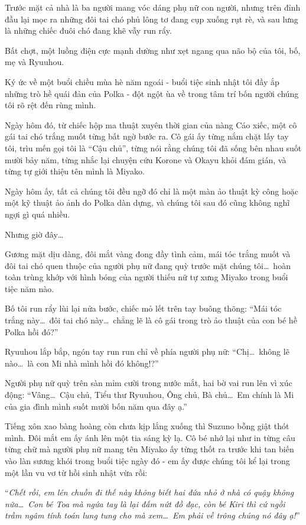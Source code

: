 \documentclass[../main.tex]{subfiles}
\begin{document}
Trước mặt cả nhà là ba người mang vóc dáng phụ nữ con người, nhưng trên đỉnh đầu lại mọc ra những đôi tai chó phủ lông tơ đang cụp xuống rụt rè, và sau lưng là những chiếc đuôi chó đang khẽ vẫy run rẩy.

Bất chợt, một luồng điện cực mạnh dường như xẹt ngang qua não bộ của tôi, bố, mẹ và Ryuuhou.

Ký ức về một buổi chiều mùa hè năm ngoái - buổi tiệc sinh nhật tôi đầy ắp những trò hề quái đản của Polka - đột ngột ùa về trong tâm trí bốn người chúng tôi rõ rệt đến rùng mình.

Ngày hôm đó, từ chiếc hộp ma thuật xuyên thời gian của nàng Cáo xiếc, một cô gái tai chó trắng muốt từng bất ngờ bước ra. Cô gái ấy từng nắm chặt lấy tay tôi, trìu mến gọi tôi là ``Cậu chủ'', từng nói rằng chúng tôi đã sống bên nhau suốt mười bảy năm, từng nhắc lại chuyện cứu Korone và Okayu khỏi đám gián, và từng tự giới thiệu tên mình là Miyako.

Ngày hôm ấy, tất cả chúng tôi đều ngỡ đó chỉ là một màn ảo thuật kỳ công hoặc một kỹ thuật ảo ảnh do Polka dàn dựng, và chúng tôi sau đó cũng không nghĩ ngợi gì quá nhiều.

Nhưng giờ đây\dots

Gương mặt dịu dàng, đôi mắt vàng đong đầy tình cảm, mái tóc trắng muốt và đôi tai chó quen thuộc của người phụ nữ đang quỳ trước mặt chúng tôi\dots\ hoàn toàn trùng khớp với hình bóng của người thiếu nữ tự xưng Miyako trong buổi tiệc năm nào.

Bố tôi run rẩy lùi lại nửa bước, chiếc mỏ lết trên tay buông thõng: ``Mái tóc trắng này\dots\ đôi tai chó này\dots\ chẳng lẽ là cô gái trong trò ảo thuật của con bé hề Polka hồi đó?''

Ryuuhou lắp bắp, ngón tay run run chỉ về phía người phụ nữ: ``Chị\dots\ không lẽ nào\dots\ là con Mi nhà mình hồi đó không!?''

Người phụ nữ quỳ trên sàn mỉm cười trong nước mắt, hai bờ vai run lên vì xúc động: ``Vâng\dots\ Cậu chủ, Tiểu thư Ryuuhou, Ông chủ, Bà chủ\dots\ Em chính là Mi của gia đình mình suốt mười bốn năm qua đây ạ.''

Tiếng xôn xao bàng hoàng còn chưa kịp lắng xuống thì Suzuno bỗng giật thót mình. Đôi mắt em ấy ánh lên một tia sáng kỳ lạ. Cô bé nhớ lại như in từng câu từng chữ mà người phụ nữ mang tên Miyako ấy từng thốt ra trước khi tan biến vào làn sương khói trong buổi tiệc ngày đó - em ấy được chúng tôi kể lại trong một lần vu vơ từ hồi sinh nhật vừa rồi:

``\textit{Chết rồi, em lén chuồn đi thế này không biết hai đứa nhỏ ở nhà có quậy không nữa\dots\ Con bé Toa mà ngứa tay là lại đấm nứt đồ đạc, còn bé Kiri thì cứ ngồi trầm ngâm tính toán lung tung cho mà xem\dots\ Em phải về trông chúng nó đây ạ!}''
\end{document}
